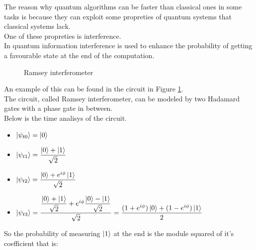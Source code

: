 \documentclass{article}
\begin{document}
The reason why quantum algorithms can be faster than classical ones
in some tasks is because they can exploit some propreties of quantum
systems that classical systems lack. \\
One of these propreties is interference.\\
In quantum information interference is used to enhance the probability of
getting a favourable state at the end of the computation.\\
\vspace{10pt}
\begin{figure}[H]
	\centering
	\caption{Ramsey interferometer}
	\label{interference}
\end{figure}
\vspace{10pt}
An example of this can be found in the circuit in Figure \ref{interference}.\\
The circuit, called Ramsey interferometer, can be modeled by two Hadamard gates with a phase gate
in between.\\
\newpage
Below is the time analisys of the circuit.
\begin{itemize}

	\item $\ket{\psi_{t0}} = \ket{0}$
	\item $\ket{\psi_{t1}} = \dfrac{\ket{0}+\ket{1}}{\sqrt{2}}$
	\item $\ket{\psi_{t2}} = \dfrac{\ket{0}+e^{i\phi}\ket{1}}{\sqrt{2}}$
	\item $\ket{\psi_{t3}} = \dfrac{\dfrac{\ket{0}+\ket{1}}{\sqrt{2}}+e^{i\phi}\dfrac{\ket{0}-\ket{1}}
		      {\sqrt{2}}}{\sqrt{2}}   = \dfrac{(1+e^{i\phi})\ket{0}+(1-e^{i\phi})\ket{1}}{2}$




\end{itemize}

\vspace{20pt}

So the probability of measuring $\ket{1}$ at the end is the module squared of it's\\
coefficient that is:\\
\vspace{10pt}
\end{document}
